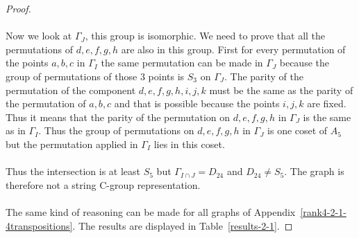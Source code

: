 \begin{proof}
  \paragraph{}
  Now we look at $\Gamma_{J}$, this group is isomorphic. We need to prove that all the permutations of $d,e,f,g,h$ are also in this group. First for every permutation of the points $a,b,c$ in $\Gamma_{I}$ the same permutation can be made in $\Gamma_{J}$ because the group of permutations of those 3 points is $S_3$ on $\Gamma_{J}$. The parity of the permutation of the component $d,e,f,g,h,i,j,k$ must be the same as the parity of the permutation of $a,b,c$ and that is possible because the points $i,j,k$ are fixed. Thus it means that the parity of the permutation on $d,e,f,g,h$ in $\Gamma_{J}$ is the same as in $\Gamma_{I}$. Thus the group of permutations on $d,e,f,g,h$ in $\Gamma_{J}$ is one coset of $A_5$ but the permutation applied in $\Gamma_{I}$ lies in this coset.

  \paragraph{}
  Thus the intersection is at least $S_5$ but $\Gamma_{I \cap J} = D_{24}$ and $D_{24} \neq S_5$. The graph is therefore not a string C-group representation.

  \paragraph{}
  The same kind of reasoning can be made for all graphs of Appendix~\ref{rank4-2-1-4transpositions}. The results are displayed in Table~\ref{results-2-1}.


\end{proof}
